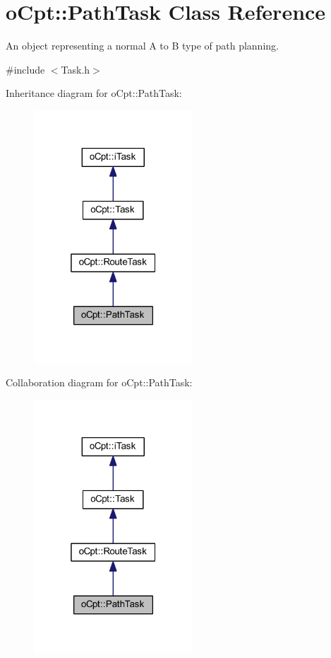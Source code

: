 \hypertarget{classo_cpt_1_1_path_task}{}\section{o\+Cpt\+:\+:Path\+Task Class Reference}
\label{classo_cpt_1_1_path_task}


An object representing a normal A to B type of path planning.  




{\ttfamily \#include $<$Task.\+h$>$}



Inheritance diagram for o\+Cpt\+:\+:Path\+Task\+:\nopagebreak
\begin{figure}[H]
\begin{center}
\leavevmode
\includegraphics[width=169pt]{classo_cpt_1_1_path_task__inherit__graph}
\end{center}
\end{figure}


Collaboration diagram for o\+Cpt\+:\+:Path\+Task\+:\nopagebreak
\begin{figure}[H]
\begin{center}
\leavevmode
\includegraphics[width=169pt]{classo_cpt_1_1_path_task__coll__graph}
\end{center}
\end{figure}
